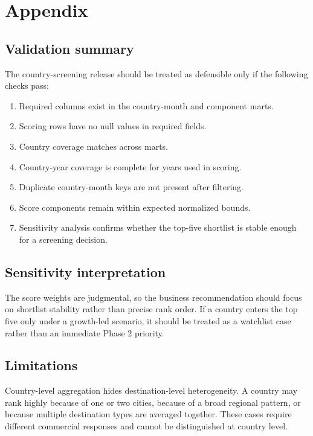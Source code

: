 \section{Appendix}

\subsection{Validation summary}

The country-screening release should be treated as defensible only if the following checks pass:

\begin{qualitycheck}
\begin{enumerate}
  \item Required columns exist in the country-month and component marts.
  \item Scoring rows have no null values in required fields.
  \item Country coverage matches across marts.
  \item Country-year coverage is complete for years used in scoring.
  \item Duplicate country-month keys are not present after filtering.
  \item Score components remain within expected normalized bounds.
  \item Sensitivity analysis confirms whether the top-five shortlist is stable enough for a screening decision.
\end{enumerate}
\end{qualitycheck}

\subsection{Sensitivity interpretation}

The score weights are judgmental, so the business recommendation should focus on shortlist stability rather than precise rank order. If a country enters the top five only under a growth-led scenario, it should be treated as a watchlist case rather than an immediate Phase 2 priority.

\subsection{Limitations}

\begin{limitation}
Country-level aggregation hides destination-level heterogeneity. A country may rank highly because of one or two cities, because of a broad regional pattern, or because multiple destination types are averaged together. These cases require different commercial responses and cannot be distinguished at country level.
\end{limitation}

